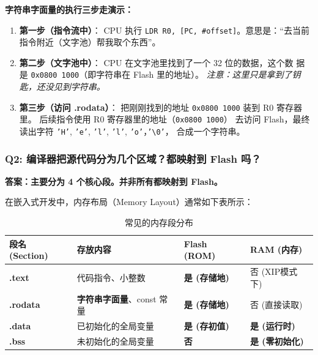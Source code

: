 \textbf{字符串字面量的执行三步走演示：}

\begin{enumerate}[label=\ding{\numexpr171+\arabic*}]
    \item \textbf{第一步（指令流中）}：
    CPU 执行 \texttt{LDR R0, [PC, \#offset]}。意思是：“去当前指令附近（文字池）帮我取个东西”。
    
    \item \textbf{第二步（文字池中）}：
    CPU 在文字池里找到了一个 32 位的数据，这个数
    据是 \texttt{0x0800 1000}（即字符串在 Flash 里的地址）。
    \textit{注意：这里只是拿到了钥匙，还没见到字符串。}
    
    \item \textbf{第三步（访问 .rodata）}：
    把刚刚找到的地址 \texttt{0x0800 1000} 装到 R0 寄存器里。
    后续指令使用 R0 寄存器里的地址（\texttt{0x0800 1000}）
    去访问 Flash，最终读出字符 \texttt{'H'}, \texttt{'e'},
     \texttt{'l'}, \texttt{'l'}, \texttt{'o'}，\texttt{'\textbackslash 0'}，
    合成一个字符串。
\end{enumerate}
\newpage

\subsubsection{Q2: 编译器把源代码分为几个区域？都映射到 Flash 吗？}

\textbf{答案：主要分为 4 个核心段。并非所有都映射到 Flash。}
\vspace{1em}

在嵌入式开发中，内存布局（Memory Layout）通常如下表所示：

\begin{table}[h]
\centering
\caption{常见的内存段分布}\label{tab:memory-sections}
\begin{tabular}{|l|l|l|l|}
\hline
\textbf{段名 (Section)} & \textbf{存放内容} & \textbf{Flash (ROM)} & \textbf{RAM (内存)} \\ \hline
\textbf{.text} & 代码指令、小整数 & \textbf{是 (存储地)} & 否 (XIP模式下) \\ \hline
\textbf{.rodata} & \textbf{字符串字面量}、const 常量 & \textbf{是 (存储地)} & 否 (直接读取) \\ \hline
\textbf{.data} & 已初始化的全局变量 & \textbf{是 (存初值)} & \textbf{是 (运行时)} \\ \hline
\textbf{.bss} & 未初始化的全局变量 & \textbf{否} & \textbf{是 (零初始化)} \\ \hline
\end{tabular}
\end{table}


